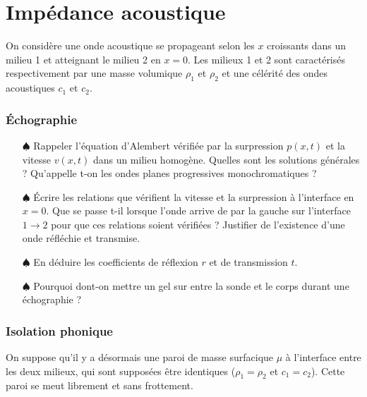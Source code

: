 \documentclass{report}
\begin{document}
\newpage

\section*{Impédance acoustique}

On considère une onde acoustique se propageant selon les $x$ croissants dans un milieu 1 et atteignant le milieu 2 en $x=0$. Les milieux 1 et 2 sont caractérisés respectivement par une masse volumique $\rho_1$ et $\rho_2$ et une célérité des ondes acoustiques $c_1$ et $c_2$. 

\subsubsection*{Échographie}

\begin{itemize}
	
	\item[$\spadesuit$] Rappeler l'équation d'Alembert vérifiée par la surpression $p(x,t)$ et la vitesse $v(x,t)$ dans un milieu homogène. Quelles sont les solutions générales ? Qu'appelle t-on les ondes planes progressives monochromatiques ?	
	
	\item[$\spadesuit$] Écrire les relations que vérifient la vitesse et la surpression à l'interface en $x=0$. Que se passe t-il lorsque l'onde arrive de par la gauche sur l'interface $1\longrightarrow2$ pour que ces relations soient vérifiées ? Justifier de l'existence d'une onde réfléchie et transmise.
	
	\item[$\spadesuit$] En déduire les coefficients de réflexion $r$ et de transmission $t$.
	
	\item[$\spadesuit$] Pourquoi dont-on mettre un gel sur entre la sonde et le corps durant une échographie ? 
		
\end{itemize}

\subsubsection*{Isolation phonique}

On suppose qu'il y a désormais une paroi de masse surfacique $\mu$ à l'interface entre les deux milieux, qui sont supposées être identiques ($\rho_1=\rho_2$ et $c_1=c_2$). Cette paroi se meut librement et sans frottement. 
\end{document}
